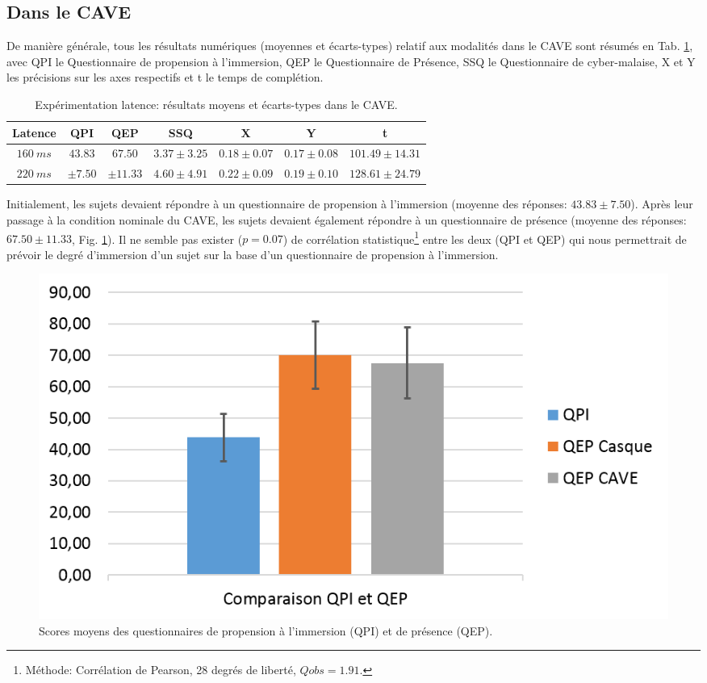 	\subsection{Dans le CAVE}
	\par De manière générale, tous les résultats numériques (moyennes et écarts-types) relatif aux modalités dans le CAVE sont résumés en Tab. \ref{tab:resultats_cave_latence}, avec QPI le Questionnaire de propension à l'immersion, QEP le Questionnaire de Présence, SSQ le Questionnaire de cyber-malaise, X et Y les précisions sur les axes respectifs et t le temps de complétion.
	
	\begin{table}[h]	
		\centering
		\caption{Expérimentation latence: résultats moyens et écarts-types dans le CAVE.}
		\label{tab:resultats_cave_latence}
		\begin{tabular}{c|c|c|c|c|c|c}
			\textbf{Latence} & \textbf{QPI} & \textbf{QEP} & \textbf{SSQ} & \textbf{X} & \textbf{Y} & \textbf{t}\\ \hline			
			$160~ms$ & $43.83$ & $67.50$ & $3.37 \pm 3.25$ & $0.18 \pm 0.07$ & $0.17 \pm 0.08$ & $101.49 \pm 14.31$\\
			$220~ms$ & $\pm 7.50$ & $\pm 11.33$ & $4.60 \pm 4.91$ & $0.22 \pm 0.09$ & $0.19 \pm 0.10$ & $128.61 \pm 24.79$\\
		\end{tabular}
	\end{table}
	
	\par Initialement, les sujets devaient répondre à un questionnaire de propension à l'immersion (moyenne des réponses: $43.83 \pm 7.50$).	Après leur passage à la condition nominale du CAVE, les sujets devaient également répondre à un questionnaire de présence (moyenne des réponses: $67.50 \pm 11.33$, Fig. \ref{fig:itq_pq}). Il ne semble pas exister ($p = 0.07$) de corrélation statistique\footnote{Méthode: Corrélation de Pearson, 28 degrés de liberté, $Qobs = 1.91$.} entre les deux (QPI et QEP) qui nous permettrait de prévoir le degré d'immersion d'un sujet sur la base d'un questionnaire de propension à l'immersion.
	
	\begin{figure}
		\centering
		\includegraphics[width=0.8\linewidth]{Figures/ITQvPQ.png}
		\caption{Scores moyens des questionnaires de propension à l'immersion (QPI) et de présence (QEP).}
		\label{fig:itq_pq}
	\end{figure}
	
